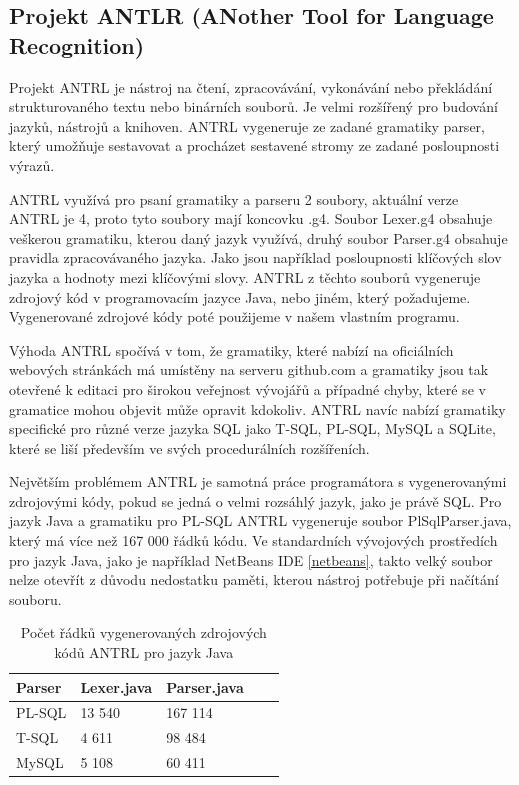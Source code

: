 \documentclass[czech,bachelor,public,dept460,male,cpdeclaration,twoside]{diploma}
\begin{document}
\subsection{Projekt ANTLR (ANother Tool for Language Recognition)}
Projekt ANTRL je nástroj na čtení, zpracovávání, vykonávání nebo překládání strukturovaného textu nebo binárních souborů. Je velmi rozšířený pro budování jazyků, nástrojů a knihoven. ANTRL vygeneruje ze zadané gramatiky parser, který umožňuje sestavovat a procházet sestavené stromy ze zadané posloupnosti výrazů. \cite{antrl}



ANTRL využívá pro psaní gramatiky a parseru 2 soubory, aktuální verze ANTRL je 4, proto tyto soubory mají koncovku .g4. Soubor Lexer.g4 obsahuje veškerou gramatiku, kterou daný jazyk využívá, druhý soubor Parser.g4 obsahuje pravidla zpracovávaného jazyka. Jako jsou například posloupnosti klíčových slov jazyka a hodnoty mezi klíčovými slovy.
ANTRL z těchto souborů vygeneruje zdrojový kód v programovacím jazyce Java, nebo jiném, který požadujeme. Vygenerované zdrojové kódy poté použijeme v našem vlastním programu. \cite{antrldocs}



Výhoda ANTRL spočívá v tom, že gramatiky, které nabízí na oficiálních webových stránkách má umístěny na serveru github.com a gramatiky jsou tak otevřené k editaci pro širokou veřejnost vývojářů a případné chyby, které se v gramatice mohou objevit může opravit kdokoliv. ANTRL navíc nabízí gramatiky specifické pro různé verze jazyka SQL jako T-SQL, PL-SQL, MySQL a SQLite, které se liší především ve svých procedurálních rozšířeních. \cite{antrlg}



Největším problémem ANTRL je samotná práce programátora s vygenerovanými zdrojovými kódy, pokud se jedná o velmi rozsáhlý jazyk, jako je právě SQL. Pro jazyk Java a gramatiku pro PL-SQL ANTRL vygeneruje soubor PlSqlParser.java, který má více než 167 000 řádků kódu. Ve standardních vývojových prostředích pro jazyk Java, jako je například NetBeans IDE \ref{netbeans}, takto velký soubor nelze otevřít z důvodu nedostatku paměti, kterou nástroj potřebuje při načítání souboru.

\begin{table}[!htbp]
	\centering
	\caption{Počet řádků vygenerovaných zdrojových kódů ANTRL pro jazyk Java}
	\label{tab:parsers}
	\begin{tabular}{lllll}
		\toprule
		Parser & Lexer.java & Parser.java\\
		\midrule
		PL-SQL & 13 540 & 167 114 \\
        T-SQL & 4 611 & 98 484 \\
        MySQL & 5 108 & 60 411 \\
		\midrule
	\end{tabular}
\end{table}
\end{document}
